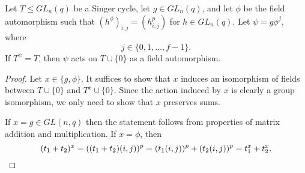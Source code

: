 \begin{Lem}\label{sin2}
Let $T \le GL_n(q)$ be a Singer cycle, let $g \in GL_n(q)$, and let $\phi$ be the field automorphism such that $(h^{\phi})_{i,j}=(h_{i,j}^p)$ for $h \in GL_n(q)$. Let  $\psi=g \phi^j$, where $$j \in \{0,1, \ldots , f-1\}.$$    If $T^{\psi}=T$, then $\psi$ acts on $T \cup \{0\}$ as a field automorphism.
\end{Lem}
\begin{proof}
Let $x \in \{g, \phi\}.$ It suffices to show that  $x$ induces an isomorphism of fields between $T \cup \{0\}$ and $T^x \cup \{0\}$. Since the action induced by $x$ is clearly a group isomorphism, we only need to show that $x$ preserves sums.

If $x=g \in GL(n,q)$ then the statement follows from properties of matrix addition and multiplication. If $x=\phi$, then  \begin{equation*}(t_1 +t_2)^x=((t_1 +t_2)(i,j))^p=(t_1(i,j))^p+(t_2(i,j))^p=t_1^x+t_2^x. \qedhere
\end{equation*}


\end{proof}




